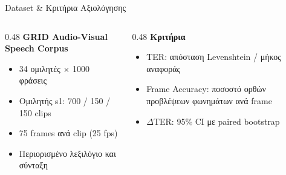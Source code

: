 \documentclass[aspectratio=169,10pt,xcolor=table]{beamer}
\begin{document}
\begin{frame}{Dataset \& Κριτήρια Αξιολόγησης}
  \begin{columns}[T]
    \begin{column}{0.48\textwidth}
      \textbf{GRID Audio-Visual Speech Corpus}
      \begin{itemize}
        \item 34 ομιλητές $\times$ 1000 φράσεις
        \item Ομιλητής s1: 700 / 150 / 150 clips
        \item 75 frames ανά clip (25 fps)
        \item Περιορισμένο λεξιλόγιο και σύνταξη
      \end{itemize}
    \end{column}
    \begin{column}{0.48\textwidth}
      \textbf{Κριτήρια}
      \begin{itemize}
        \item \alert{TER}: απόσταση Levenshtein / μήκος αναφοράς
        \item Frame Accuracy: ποσοστό ορθών προβλέψεων φωνημάτων ανά frame
        \item $\Delta$TER: 95\% CI με paired bootstrap
      \end{itemize}
    \end{column}
  \end{columns}
  \vfill
  \centering
\end{frame}
\end{document}
